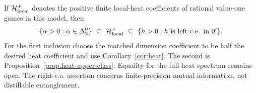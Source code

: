 If $\mathcal H^+_{\rm local}$ denotes the positive finite local-heat coefficients of rational value-one games in this model, then
\begin{equation}\label{eq:heat-spectrum-inclusions}
 \{\alpha>0:\alpha\in\Delta^0_2\}
 \ \subseteq\ \mathcal H^+_{\rm local}
 \ \subseteq\ \{h>0:h\text{ is left-c.e. in }0'\}.
\end{equation}
For the first inclusion choose the matched dimension coefficient to be half the desired heat coefficient and use Corollary~\ref{cor:heat}. The second is Proposition~\ref{prop:heat-upper-class}. Equality for the full heat spectrum remains open. The right-c.e. assertion concerns finite-precision mutual information, not distillable entanglement.

